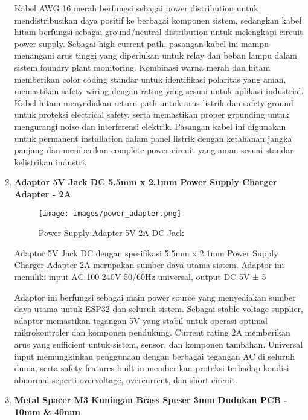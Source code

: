 \documentclass[12pt,a4paper]{article}
\begin{document}
\begin{enumerate}[leftmargin=0pt,itemsep=1em]
Kabel AWG 16 merah berfungsi sebagai power distribution untuk mendistribusikan daya positif ke berbagai komponen sistem, sedangkan kabel hitam berfungsi sebagai ground/neutral distribution untuk melengkapi circuit power supply. Sebagai high current path, pasangan kabel ini mampu menangani arus tinggi yang diperlukan untuk relay dan beban lampu dalam sistem foundry plant monitoring. Kombinasi warna merah dan hitam memberikan color coding standar untuk identifikasi polaritas yang aman, memastikan safety wiring dengan rating yang sesuai untuk aplikasi industrial. Kabel hitam menyediakan return path untuk arus listrik dan safety ground untuk proteksi electrical safety, serta memastikan proper grounding untuk mengurangi noise dan interferensi elektrik. Pasangan kabel ini digunakan untuk permanent installation dalam panel listrik dengan ketahanan jangka panjang dan memberikan complete power circuit yang aman sesuai standar kelistrikan industri.

\item \textbf{Adaptor 5V Jack DC 5.5mm x 2.1mm Power Supply Charger Adapter - 2A}

\begin{figure}[H]
\centering
\texttt{[image: images/power\_adapter.png]}
\caption{Power Supply Adapter 5V 2A DC Jack}
\label{fig:power_adapter}
\end{figure}

Adaptor 5V Jack DC dengan spesifikasi 5.5mm x 2.1mm Power Supply Charger Adapter 2A merupakan sumber daya utama sistem. Adaptor ini memiliki input AC 100-240V 50/60Hz universal, output DC 5V ± 5%

Adaptor ini berfungsi sebagai main power source yang menyediakan sumber daya utama untuk ESP32 dan seluruh sistem. Sebagai stable voltage supplier, adaptor memastikan tegangan 5V yang stabil untuk operasi optimal mikrokontroler dan komponen pendukung. Current rating 2A memberikan arus yang sufficient untuk sistem, sensor, dan komponen tambahan. Universal input memungkinkan penggunaan dengan berbagai tegangan AC di seluruh dunia, serta safety features built-in memberikan proteksi terhadap kondisi abnormal seperti overvoltage, overcurrent, dan short circuit.

\item \textbf{Metal Spacer M3 Kuningan Brass Speser 3mm Dudukan PCB - 10mm \& 40mm}


\end{enumerate}
\end{document}
